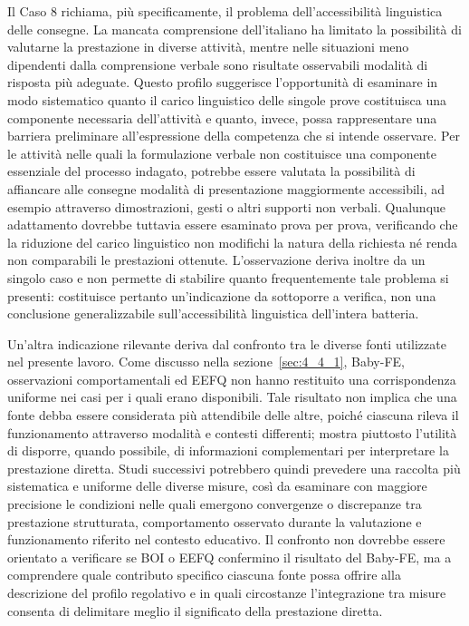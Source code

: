 Il Caso 8 richiama, più specificamente, il problema dell'accessibilità linguistica delle consegne. La mancata comprensione dell'italiano ha limitato la possibilità di valutarne la prestazione in diverse attività, mentre nelle situazioni meno dipendenti dalla comprensione verbale sono risultate osservabili modalità di risposta più adeguate. Questo profilo suggerisce l'opportunità di esaminare in modo sistematico quanto il carico linguistico delle singole prove costituisca una componente necessaria dell'attività e quanto, invece, possa rappresentare una barriera preliminare all'espressione della competenza che si intende osservare. Per le attività nelle quali la formulazione verbale non costituisce una componente essenziale del processo indagato, potrebbe essere valutata la possibilità di affiancare alle consegne modalità di presentazione maggiormente accessibili, ad esempio attraverso dimostrazioni, gesti o altri supporti non verbali. Qualunque adattamento dovrebbe tuttavia essere esaminato prova per prova, verificando che la riduzione del carico linguistico non modifichi la natura della richiesta né renda non comparabili le prestazioni ottenute. L'osservazione deriva inoltre da un singolo caso e non permette di stabilire quanto frequentemente tale problema si presenti: costituisce pertanto un'indicazione da sottoporre a verifica, non una conclusione generalizzabile sull'accessibilità linguistica dell'intera batteria.

Un'altra indicazione rilevante deriva dal confronto tra le diverse fonti utilizzate nel presente lavoro. Come discusso nella sezione~\ref{sec:4_4_1}, Baby-FE, osservazioni comportamentali ed EEFQ non hanno restituito una corrispondenza uniforme nei casi per i quali erano disponibili. Tale risultato non implica che una fonte debba essere considerata più attendibile delle altre, poiché ciascuna rileva il funzionamento attraverso modalità e contesti differenti; mostra piuttosto l'utilità di disporre, quando possibile, di informazioni complementari per interpretare la prestazione diretta. Studi successivi potrebbero quindi prevedere una raccolta più sistematica e uniforme delle diverse misure, così da esaminare con maggiore precisione le condizioni nelle quali emergono convergenze o discrepanze tra prestazione strutturata, comportamento osservato durante la valutazione e funzionamento riferito nel contesto educativo. Il confronto non dovrebbe essere orientato a verificare se BOI o EEFQ confermino il risultato del Baby-FE, ma a comprendere quale contributo specifico ciascuna fonte possa offrire alla descrizione del profilo regolativo e in quali circostanze l'integrazione tra misure consenta di delimitare meglio il significato della prestazione diretta.

